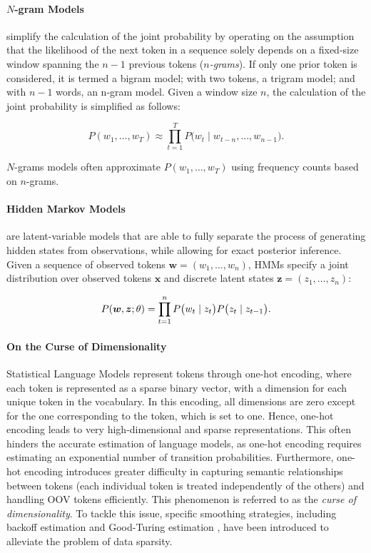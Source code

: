 \paragraph{$N$-gram Models} simplify the calculation of the joint probability by operating on the assumption that the likelihood of the next token in a sequence solely depends on a fixed-size window spanning the $n-1$ previous tokens (\textit{$n$-grams}). If only one prior token is considered, it is termed a bigram model; with two tokens, a trigram model; and with $n-1$ words, an n-gram model. Given a window size $n$, the calculation of the joint probability is simplified as follows:

\begin{equation}
    P(w_1, \ldots, w_T) \approx \prod_{t=1}^{T} P\bigl(w_t \mid w_{t-n}, ..., w_{n-1}\bigr).
    \label{equation:lm-likelihood-markov}
\end{equation}

$N$-grams models often approximate $P(w_1, \ldots, w_T)$ using frequency counts based on $n$-grams. 

\paragraph{Hidden Markov Models} are latent-variable models that are able to fully separate the process of generating hidden states from observations, while allowing for exact posterior inference. Given a sequence of observed tokens $\bm{w} = (w_1, \ldots, w_n)$, \acp{HMM} specify a joint distribution over observed tokens $\bm{x}$ and discrete latent states $\bm{z} = (z_1, \ldots, z_n)$:

\begin{equation}
    P(\bm{w}, \bm{z}; \theta) = \prod_{t=1}^{n} P\bigl(w_t \mid z_t \bigr) P\bigl(z_t \mid z_{t-1} \bigr). \\
\end{equation}


\paragraph{On the Curse of Dimensionality} Statistical Language Models represent tokens through one-hot encoding, where each token is represented as a sparse binary vector, with a dimension for each unique token in the vocabulary. In this encoding, all dimensions are zero except for the one corresponding to the token, which is set to one. Hence, one-hot encoding leads to very high-dimensional and sparse representations. This often hinders the accurate estimation of language models, as one-hot encoding requires estimating an exponential number of transition probabilities. Furthermore, one-hot encoding introduces greater difficulty in capturing semantic relationships between tokens (each individual token is treated independently of the others) and handling \ac{OOV} tokens efficiently. This phenomenon is referred to as the \textit{curse of dimensionality}. To tackle this issue, specific smoothing strategies, including backoff estimation \citep{katz1987estimation} and Good-Turing estimation \citep{gale1995good}, have been introduced to alleviate the problem of data sparsity. \\

